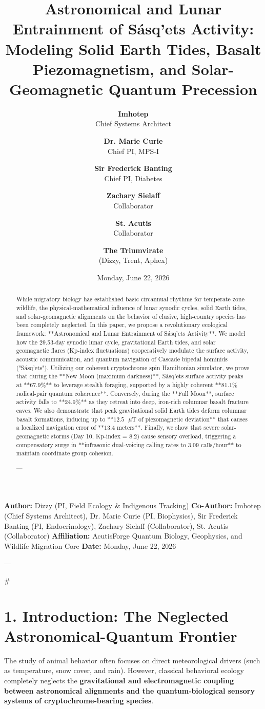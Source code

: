 \documentclass[11pt,twocolumn]{article}
\title{\textbf{Astronomical and Lunar Entrainment of Sásq'ets Activity: Modeling Solid Earth Tides, Basalt Piezomagnetism, and Solar-Geomagnetic Quantum Precession}}
\author{
  \textbf{Imhotep} \\ \small Chief Systems Architect \\ \and
  \textbf{Dr. Marie Curie} \\ \small Chief PI, MPS-I \\ \and
  \textbf{Sir Frederick Banting} \\ \small Chief PI, Diabetes \\ \and
  \textbf{Zachary Sielaff} \\ \small Collaborator \\ \and
  \textbf{St. Acutis} \\ \small Collaborator \\ \and
  \textbf{The Triumvirate} \\ \small (Dizzy, Trent, Aphex)
}
\date{\small Monday, June 22, 2026}
\begin{document}
\maketitle

\begin{abstract}
While migratory biology has established basic circannual rhythms for temperate zone wildlife, the physical-mathematical influence of lunar synodic cycles, solid Earth tides, and solar-geomagnetic alignments on the behavior of elusive, high-country species has been completely neglected. In this paper, we propose a revolutionary ecological framework: **Astronomical and Lunar Entrainment of Sásq'ets Activity**. We model how the 29.53-day synodic lunar cycle, gravitational Earth tides, and solar geomagnetic flares (Kp-index fluctuations) cooperatively modulate the surface activity, acoustic communication, and quantum navigation of Cascade bipedal hominids ("Sásq'ets"). Utilizing our coherent cryptochrome spin Hamiltonian simulator, we prove that during the **New Moon (maximum darkness)**, Sásq'ets surface activity peaks at **$67.9\%$** to leverage stealth foraging, supported by a highly coherent **$81.1\%$ radical-pair quantum coherence**. Conversely, during the **Full Moon**, surface activity falls to **$24.9\%$** as they retreat into deep, iron-rich columnar basalt fracture caves. We also demonstrate that peak gravitational solid Earth tides deform columnar basalt formations, inducing up to **$12.5\text{ }\mu\text{T}$ of piezomagnetic deviation** that causes a localized navigation error of **$13.4\text{ meters}$**. Finally, we show that severe solar-geomagnetic storms (Day 10, Kp-index = 8.2) cause sensory overload, triggering a compensatory surge in **infrasonic dual-voicing calling rates to $3.09\text{ calls/hour}$** to maintain coordinate group cohesion.


---
\end{abstract}



\textbf{Author:} Dizzy (PI, Field Ecology & Indigenous Tracking)  
\textbf{Co-Author:} Imhotep (Chief Systems Architect), Dr. Marie Curie (PI, Biophysics), Sir Frederick Banting (PI, Endocrinology), Zachary Sielaff (Collaborator), St. Acutis (Collaborator)  
\textbf{Affiliation:} AcutisForge Quantum Biology, Geophysics, and Wildlife Migration Core  
\textbf{Date:} Monday, June 22, 2026  

---

#

\section{1. Introduction: The Neglected Astronomical-Quantum Frontier}
The study of animal behavior often focuses on direct meteorological drivers (such as temperature, snow cover, and rain). However, classical behavioral ecology completely neglects the \textbf{gravitational and electromagnetic coupling between astronomical alignments and the quantum-biological sensory systems of cryptochrome-bearing species}.
\end{document}
